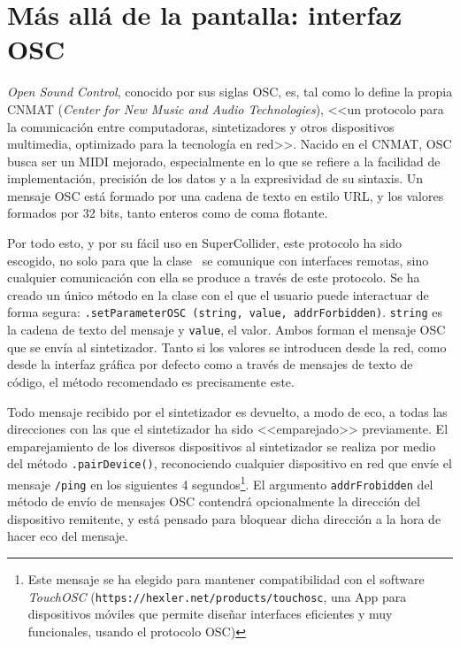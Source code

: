 \section[Interfaz OSC]{Más allá de la pantalla: interfaz OSC}
\label{sec:osc}

\textit{Open Sound Control}, conocido por sus siglas OSC, es, tal como lo define la propia CNMAT (\textit{Center for New Music and Audio Technologies}), <<un protocolo para la comunicación entre computadoras, sintetizadores y otros dispositivos multimedia, optimizado para la tecnología en red>>. Nacido en el CNMAT, OSC busca ser un MIDI mejorado, especialmente en lo que se refiere a la facilidad de implementación, precisión de los datos y a la expresividad de su sintaxis. Un mensaje OSC está formado por una cadena de texto en estilo URL, y los valores formados por 32 bits, tanto enteros como de coma flotante. 

Por todo esto, y por su fácil uso en SuperCollider, este protocolo ha sido escogido, no solo para que la clase \className\  se comunique con interfaces remotas, sino cualquier comunicación con ella se produce a través de este protocolo. Se ha creado un único método en la clase con el que el usuario puede interactuar de forma segura: \texttt{\className.setParameterOSC (string, value, addrForbidden)}. \texttt{string} es la cadena de texto del mensaje y \texttt{value}, el valor. Ambos forman el mensaje OSC que se envía al sintetizador. Tanto si los valores se introducen desde la red, como desde la interfaz gráfica por defecto como a través de mensajes de texto de código, el método recomendado es precisamente este.

Todo mensaje recibido por el sintetizador es devuelto, a modo de eco, a todas las direcciones con las que el sintetizador ha sido <<emparejado>> previamente. El emparejamiento de los diversos dispositivos al sintetizador se realiza por medio del método \texttt{\className.pairDevice()}, reconociendo cualquier dispositivo en red que envíe el mensaje \texttt{/ping} en los siguientes 4 segundos\footnote{Este mensaje se ha elegido para mantener compatibilidad con el software \textit{TouchOSC} (\texttt{https://hexler.net/products/touchosc}, una App para dispositivos móviles que permite diseñar interfaces eficientes y muy funcionales, usando el protocolo OSC)}. El argumento \texttt{addrFrobidden} del método de envío de mensajes OSC contendrá opcionalmente la dirección del dispositivo remitente, y está pensado para bloquear dicha dirección a la hora de hacer eco del mensaje.

